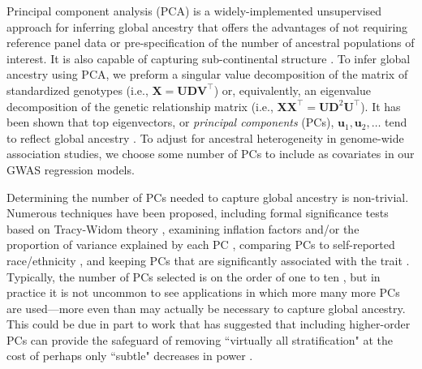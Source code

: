 \documentclass[12pt]{article}
\begin{document}
Principal component analysis (PCA) is a widely-implemented unsupervised approach for inferring global ancestry that offers the advantages of not requiring reference panel data or pre-specification of the number of ancestral populations of interest.
It is also capable of capturing sub-continental structure \citep{novembre2008}. 
To infer global ancestry using PCA, we preform a singular value decomposition of the matrix of standardized genotypes (i.e., $\mathbf{X} = \mathbf{U}\mathbf{D}\mathbf{V}^\top$) or, equivalently, an eigenvalue decomposition of the genetic relationship matrix (i.e., $\mathbf{X}\mathbf{X}^\top = \mathbf{U}\mathbf{D}^2\mathbf{U}^\top$).
It has been shown that top eigenvectors, or \textit{principal components} (PCs), $\mathbf{u}_1, \mathbf{u}_2, \dots$ tend to reflect global ancestry \citep{patterson2006, mcvean2009}.
To adjust for ancestral heterogeneity in genome-wide association studies, we choose some number of PCs %
to include as covariates in our GWAS regression models. 

Determining the number of PCs needed to capture global ancestry is non-trivial. 
Numerous techniques have been proposed, including formal significance tests based on Tracy-Widom theory \citep{patterson2006, eigenstrat}, examining inflation factors \citep{reed2015, conomos2016} and/or the proportion of variance explained by each PC \citep{raska2012, reed2015, conomos2016}, comparing PCs to self-reported race/ethnicity \citep{conomos2016}, and keeping PCs that are significantly associated with the trait \citep{reiner2012, daya2019}.
Typically, the number of PCs selected is on the order of one to ten \citep{abegaz2019}, but in practice it is not uncommon to see applications in which more many more PCs are used---more even than may actually be necessary to capture global ancestry. 
This could be due in part to work that has suggested that including higher-order PCs can provide the safeguard of removing ``virtually all stratification" \citep{mathieson2012} at the cost of perhaps only ``subtle" decreases in power \citep{liu2011}.
\end{document}
